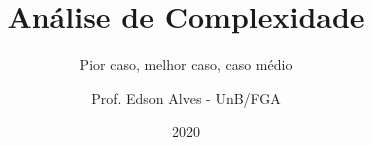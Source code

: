\title{Análise de Complexidade}
\subtitle{Pior caso, melhor caso, caso médio}
\author{Prof. Edson Alves - UnB/FGA}
\date{2020}
